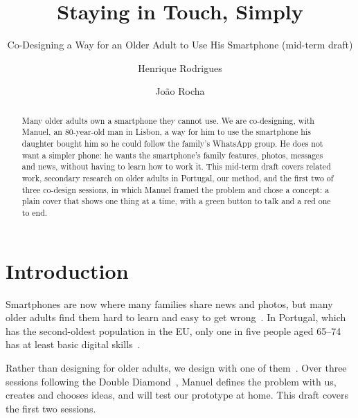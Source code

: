 \documentclass[acmtog,nonacm]{acmart}
\begin{document}
\title{Staying in Touch, Simply}
\subtitle{Co-Designing a Way for an Older Adult to Use His Smartphone (mid-term draft)}

\author{Henrique Rodrigues}
\author{Jo\~ao Rocha}

\renewcommand{\shortauthors}{Rodrigues and Rocha}

\begin{abstract}
Many older adults own a smartphone they cannot use. We are co-designing, with Manuel, an 80-year-old man in Lisbon, a way for him to use the smartphone his daughter bought him so he could follow the family's WhatsApp group. He does not want a simpler phone: he wants the smartphone's family features, photos, messages and news, without having to learn how to work it. This mid-term draft covers related work, secondary research on older adults in Portugal, our method, and the first two of three co-design sessions, in which Manuel framed the problem and chose a concept: a plain cover that shows one thing at a time, with a green button to talk and a red one to end.
\end{abstract}



\maketitle

\section{Introduction}
Smartphones are now where many families share news and photos, but many older adults find them hard to learn and easy to get wrong~\cite{kurniawan2008older, leung2012older}. In Portugal, which has the second-oldest population in the EU, only one in five people aged 65--74 has at least basic digital skills~\cite{eurostat2025population, eurostat2025digitalskills}.

Rather than designing for older adults, we design with one of them~\cite{sanders2008cocreation}. Over three sessions following the Double Diamond~\cite{designcouncil2004double}, Manuel defines the problem with us, creates and chooses ideas, and will test our prototype at home. This draft covers the first two sessions.
\end{document}
